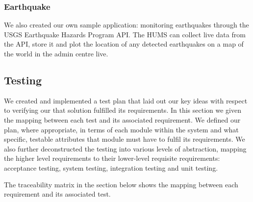 \documentclass[10pt,a4paper]{article}
\begin{document}

\subsubsection{Earthquake}
We also created our own sample application: monitoring earthquakes 
through the USGS Earthquake Hazards Program API. The HUMS
can collect live data from the API, store it and plot the location of any
detected earthquakes on a map of the world in the admin centre live.

\subsection{Testing} 
We created and implemented a test plan that laid out our key ideas
with respect to verifying our that solution fulfilled its
requirements. In this section we given the mapping between each
test and its associated requirement. We
defined our plan, where appropriate, in terms of each module within
the system and what specific, testable attributes that module must
have to fulfil its requirements. We also further deconstructed the
testing into various levels of abstraction, mapping the higher level
requirements to their lower-level requisite requirements: acceptance
testing, system testing, integration testing and unit
testing.

The traceability matrix in the section below shows the mapping 
between each requirement and its associated test.

\end{document}
